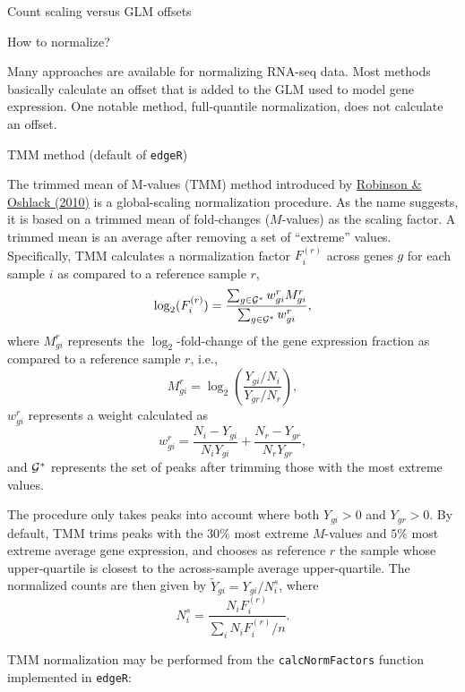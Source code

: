 \documentclass[ignorenonframetext,]{beamer}
\newenvironment{Shaded}{\begin{snugshade}}{\end{snugshade}}
\newcommand{\CommentTok}[1]{\textcolor[rgb]{0.56,0.35,0.01}{\textit{#1}}}
\newcommand{\KeywordTok}[1]{\textcolor[rgb]{0.13,0.29,0.53}{\textbf{#1}}}
\newcommand{\NormalTok}[1]{#1}
\newcommand{\OperatorTok}[1]{\textcolor[rgb]{0.81,0.36,0.00}{\textbf{#1}}}
\newcommand{\StringTok}[1]{\textcolor[rgb]{0.31,0.60,0.02}{#1}}
\begin{document}
\begin{frame}[fragile]
\begin{block}{Count scaling versus GLM offsets}
\end{block}

\begin{block}{How to normalize?}

Many approaches are available for normalizing RNA-seq data. Most methods
basically calculate an offset that is added to the GLM used to model
gene expression. One notable method, full-quantile normalization, does
not calculate an offset.

\begin{block}{TMM method (default of \texttt{edgeR})}

The trimmed mean of M-values (TMM) method introduced by
\href{https://genomebiology.biomedcentral.com/articles/10.1186/gb-2010-11-3-r25}{Robinson
\& Oshlack (2010)} is a global-scaling normalization procedure. As the
name suggests, it is based on a trimmed mean of fold-changes
(\(M\)-values) as the scaling factor. A trimmed mean is an average after
removing a set of ``extreme'' values. Specifically, TMM calculates a
normalization factor \(F_i^{(r)}\) across genes \(g\) for each sample
\(i\) as compared to a reference sample \(r\), \[
\log_2(F_i^{(r)}) = \frac{\sum_{g \in {\cal G}^*} w_{gi}^r M_{gi}^r}{\sum_{g \in {\cal G}^*} w_{gi}^r},
\] where \(M_{gi}^r\) represents the \(\log_2\)-fold-change of the gene
expression fraction as compared to a reference sample \(r\), i.e.,
\[ M_{gi}^r = \log_2\left( \frac{Y_{gi} / N_i}{ Y_{gr} / N_r} \right), \]
\(w_{gi}^r\) represents a weight calculated as \[
 w_{gi}^r = \frac{N_i - Y_{gi}}{N_i Y_{gi}} + \frac{N_r - Y_{gr}}{N_r Y_{gr}},
\] and \({\cal G}^*\) represents the set of peaks after trimming those
with the most extreme values.

The procedure only takes peaks into account where both \(Y_{gi}>0\) and
\(Y_{gr}>0\). By default, TMM trims peaks with the \(30\%\) most extreme
\(M\)-values and \(5\%\) most extreme average gene expression, and
chooses as reference \(r\) the sample whose upper-quartile is closest to
the across-sample average upper-quartile. The normalized counts are then
given by \(\tilde{Y}_{gi} = Y_{gi} / N_i^s\), where
\[N_i^s = \frac{N_i F_i^{(r)}}{\sum_i N_i F_i^{(r)}/n}.\]

TMM normalization may be performed from the \texttt{calcNormFactors}
function implemented in \texttt{edgeR}:

\begin{Shaded}
\end{Shaded}


\end{block}
\end{block}
\end{frame}
\end{document}

